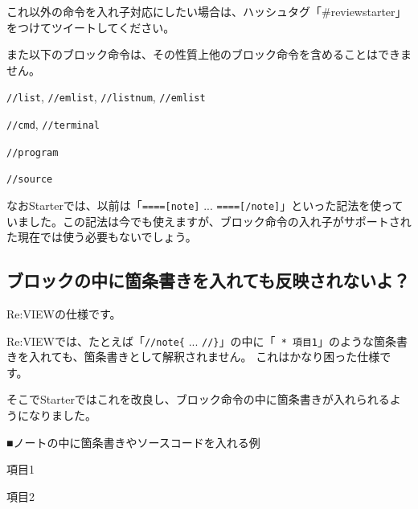 これ以外の命令を入れ子対応にしたい場合は、ハッシュタグ「\#reviewstarter」をつけてツイートしてください。

また以下のブロック命令は、その性質上他のブロック命令を含めることはできません。

\begin{starteritemize}
\item \texttt{//list}, \texttt{//emlist}, \texttt{//listnum}, \texttt{//emlist}
\item \texttt{//cmd}, \texttt{//terminal}
\item \texttt{//program}
\item \texttt{//source}
\end{starteritemize}

なおStarterでは、以前は「\texttt{====[note]} ... \texttt{====[/note]}」といった記法を使っていました。この記法は今でも使えますが、ブロック命令の入れ子がサポートされた現在では使う必要もないでしょう。

\subsection*{ブロックの中に箇条書きを入れても反映されないよ？}
\label{sec:2-3-2}
\label{subsec-faq-block2}

Re:VIEWの仕様です。

Re:VIEWでは、たとえば「\texttt{//note\{} ... \texttt{//\}}」の中に「\texttt{ * 項目1}」のような箇条書きを入れても、箇条書きとして解釈されません。
これはかなり困った仕様です。

そこでStarterではこれを改良し、ブロック命令の中に箇条書きが入れられるようになりました。

\begin{starterprogram}\end{starterprogram}
\noindent
{}

\starterresult
\begin{starternote}{■ノートの中に箇条書きやソースコードを入れる例}
\begin{starternoteinner}

\begin{starteritemize}
\item 項目1
\item 項目2
\end{starteritemize}

\end{starternoteinner}
\end{starternote}
\endstarterresult


